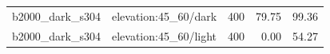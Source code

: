 \begin{longtable}{l>{\raggedright\arraybackslash}p{.42\linewidth}rrr}
b2000\_\allowbreak{}dark\_\allowbreak{}s304 & %
elevation:45\_\allowbreak{}60/dark & %
400 & %
79.75 & %
99.36 \\ %

b2000\_\allowbreak{}dark\_\allowbreak{}s304 & %
elevation:45\_\allowbreak{}60/light & %
400 & %
0.00 & %
54.27 \\ %


\end{longtable}
